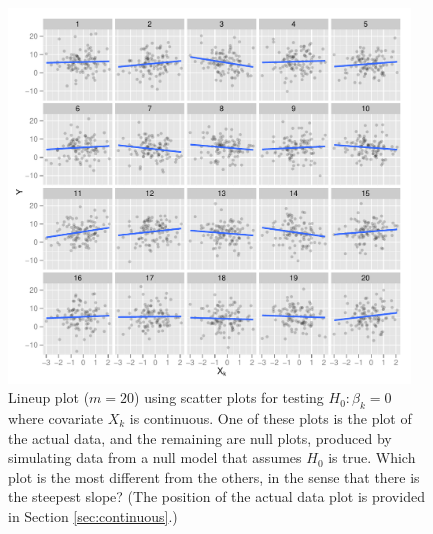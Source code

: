 \documentclass[12pt]{article}
\newcommand{\green}[1]{{\color{green} #1}} %
\begin{document}




\begin{figure}[p]
   \centering
       \includegraphics[width=0.95\textwidth]{lineup_continuous.pdf}
       \caption{Lineup plot ($m=20$) using scatter plots for testing $H_0: \beta_k=0$ where covariate $X_k$ is continuous. One of these plots is the plot of the actual data, and the remaining are null plots, produced by simulating data from a null model that assumes $H_0$ is true. Which plot is the most different from the others, in the sense that there is the steepest slope? (The position of the actual data plot is provided in Section \ref{sec:continuous}.)}
       \label{fig:test_continuous}
\end{figure}
\end{document}
